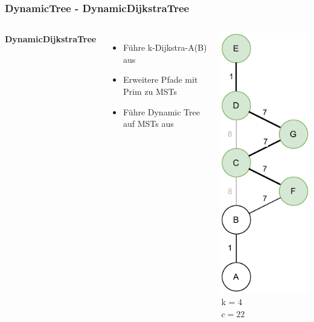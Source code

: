 \documentclass[aspectratio=169]{beamer}
\begin{document}
\begin{frame}
	\frametitle{DynamicTree - DynamicDijkstraTree}
	\begin{columns}[c] %
		
		\textbf{DynamicDijkstraTree}
		\begin{itemize}
			\item Führe k-Dijkstra-A(B) aus
			\item Erweitere Pfade mit Prim zu MSTs
			\item Führe Dynamic Tree auf MSTs aus
		\end{itemize}
		\includegraphics[scale=.6]{dynamic_prim.pdf}
		k = 4\\
		$c = 22$
		
		
	\end{columns}
	\end{frame}
\end{document}
